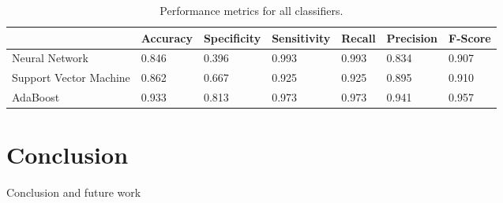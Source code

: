 \documentclass[draftcopy]{srpaper}
\begin{document}
\begin{table}
\begin{center}
\begin{tabular}{|l|l|l|l|l|l|l|}
\hline

 & Accuracy & Specificity & Sensitivity & Recall & Precision & F-Score \\ \hline
Neural Network & 0.846 & 0.396 & 0.993 & 0.993 & 0.834 & 0.907 \\ \hline
Support Vector Machine & 0.862 & 0.667 & 0.925 & 0.925 & 0.895 & 0.910 \\ \hline
AdaBoost & 0.933 & 0.813 & 0.973 & 0.973 & 0.941 & 0.957 \\ \hline

\end{tabular}
\end{center}
\caption[Performance for all Classifiers]{Performance metrics for all classifiers.}
\label{table:performance}
\end{table}


\chapter{Conclusion}
\label{Chapter:Five}
Conclusion and future work



\end{document}

